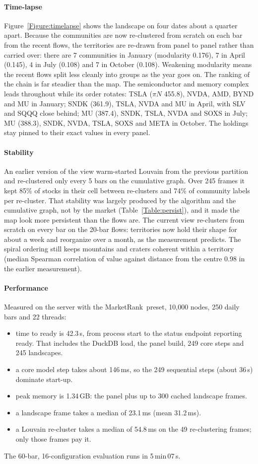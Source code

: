 \documentclass[preprint,3p,twocolumn]{elsarticle}
\newcommand{\MR}{MarketRank}
\begin{document}
\paragraph{Time-lapse} Figure~\ref{Figure:timelapse} shows the landscape on four dates about a quarter apart. Because the communities are now re-clustered from scratch on each bar from the recent flows, the territories are re-drawn from panel to panel rather than carried over: there are 7 communities in January (modularity 0.176), 7 in April (0.145), 4 in July (0.108) and 7 in October (0.108). Weakening modularity means the recent flows split less cleanly into groups as the year goes on. The ranking of the chain is far steadier than the map. The semiconductor and memory complex leads throughout while its order rotates: TSLA ($\pi N$ 455.8), NVDA, AMD, BYND and MU in January; SNDK (361.9), TSLA, NVDA and MU in April, with SLV and SQQQ close behind; MU (387.4), SNDK, TSLA, NVDA and SOXS in July; MU (388.3), SNDK, NVDA, TSLA, SOXS and META in October. The holdings stay pinned to their exact values in every panel.

\paragraph{Stability} An earlier version of the view warm-started Louvain from the previous partition and re-clustered only every 5 bars on the cumulative graph. Over 245 frames it kept 85\% of stocks in their cell between re-clusters and 74\% of community labels per re-cluster. That stability was largely produced by the algorithm and the cumulative graph, not by the market (Table~\ref{Table:persist}), and it made the map look more persistent than the flows are. The current view re-clusters from scratch on every bar on the 20-bar flows: territories now hold their shape for about a week and reorganize over a month, as the measurement predicts. The spiral ordering still keeps mountains and craters coherent within a territory (median Spearman correlation of value against distance from the centre 0.98 in the earlier measurement).

\paragraph{Performance} Measured on the server with the \MR\ preset, 10,000 nodes, 250 daily bars and 22 threads:
\begin{itemize}
\item time to ready is 42.3\,s, from process start to the status endpoint reporting ready. That includes the DuckDB load, the panel build, 249 core steps and 245 landscapes.
\item a core model step takes about 146\,ms, so the 249 sequential steps (about 36\,s) dominate start-up.
\item peak memory is 1.34\,GB: the panel plus up to 300 cached landscape frames.
\item a landscape frame takes a median of 23.1\,ms (mean 31.2\,ms).
\item a Louvain re-cluster takes a median of 54.8\,ms on the 49 re-clustering frames; only those frames pay it.
\end{itemize}
The 60-bar, 16-configuration evaluation runs in 5\,min\,07\,s.
\end{document}
